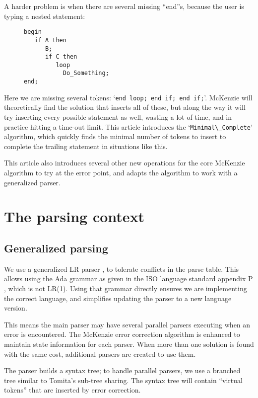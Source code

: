 \documentclass{article}
\newcommand{\code}[1]{`\lstinline|#1|'}
\begin{document}
A harder problem is when there are several missing ``end''s, because
the user is typing a nested statement:
\begin{figure}[H]
\begin{lstlisting}
begin
   if A then
      B;
      if C then
         loop
           Do_Something;
end;
\end{lstlisting}
\caption{}
\label{ex:min_com_if_if_loop}
\end{figure}

Here we are missing several tokens: \code{end loop; end if; end if;}.
McKenzie will theoretically find the solution that inserts all of
these, but along the way it will try inserting every possible
statement as well, wasting a lot of time, and in practice hitting a
time-out limit. This article introduces the \code{Minimal\_Complete}
algorithm, which quickly finds the minimal number of tokens to insert
to complete the trailing statement in situations like this.

This article also introduces several other new operations for the core
McKenzie algorithm to try at the error point, and adapts the algorithm
to work with a generalized parser.


\section{The parsing context}
\subsection{Generalized parsing}
We use a generalized LR parser \cite{Tomita 1986}, to tolerate
conflicts in the parse table. This allows using the Ada grammar as
given in the ISO language standard appendix P \cite{Ada 2012}, which
is not LR(1). Using that grammar directly ensures we are implementing
the correct language, and simplifies updating the parser to a new
language version.

This means the main parser may have several parallel parsers executing
when an error is encountered. The McKenzie error correction algorithm
is enhanced to maintain state information for each parser. When more
than one solution is found with the same cost, additional parsers are
created to use them.

The parser builds a syntax tree; to handle parallel parsers, we use a
branched tree similar to Tomita's sub-tree sharing. The syntax tree
will contain ``virtual tokens'' that are inserted by error correction.
\end{document}
